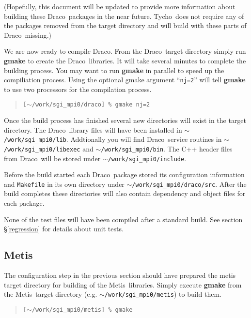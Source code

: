 \documentclass[10pt]{nmemo}
\newcommand{\comp}[1]{\normalfont\normalsize\texttt{#1}}
\newcommand{\draco}{{\normalfont\sffamily Draco}}
\newcommand{\tycho}{{\normalfont\sffamily Tycho}}
\newcommand{\metis}{{\normalfont\sffamily Metis}}
\begin{document}
(Hopefully, this document will be updated to provide more information
about building these \draco\ packages in the near future.  \tycho\ 
does not require any of the packages removed from the target directory
and will build with these parts of \draco\ missing.)

We are now ready to compile \draco.  From the \draco\ target directory
simply run \textbf{gmake} to create the \draco\ libraries.  It will
take several minutes to complete the building process.  You may want
to run \textbf{gmake} in parallel to speed up the compiliation
process.  Using the optional gmake argument ``\comp{nj=2}'' will tell 
\textbf{gmake} to use two processors for the compilation process.

\footnotesize
\begin{verse}
\texttt{[$\sim$/work/sgi\_mpi0/draco] \% gmake nj=2}
\end{verse}
\normalsize

Once the build process has finished several new directories will exist 
in the target directory.  The \draco\ library files will have been
installed in \comp{$\sim$/work/sgi\_mpi0/lib}.  Addtionally you will
find \draco\ service routines in \comp{$\sim$/work/sgi\_mpi0/libexec}
and \comp{$\sim$/work/sgi\_mpi0/bin}.  The C++ header files from
\draco\ will be stored under \comp{$\sim$/work/sgi\_mpi0/include}.

Before the build started each \draco\ package stored its configuration
information and \comp{Makefile} in its own directory under
\comp{$\sim$/work/sgi\_mpi0/draco/src}.  After the build completes
these directories will also contain dependency and object files for
each package.

None of the test files will have been compiled after a standard
build.  See section \S\ref{regression} for details about unit tests.

\subsection{\metis}

The configuration step in the previous section should have prepared
the metis target directory for building of the \metis\ libraries.
Simply execute \textbf{gmake} from the \metis\ target directory
(e.g. \comp{$\sim$/work/sgi\_mpi0/metis}) to build them.

\footnotesize
\begin{verse}
\texttt{[$\sim$/work/sgi\_mpi0/metis] \% gmake}
\end{verse}
\normalsize
\end{document}
